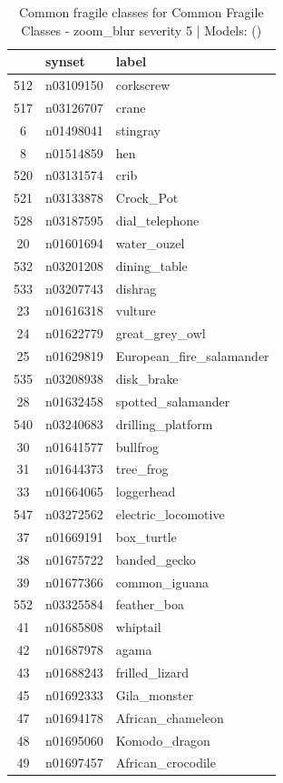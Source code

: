 \begin{table}
\caption{Common fragile classes for Common Fragile Classes - zoom_blur severity 5 | Models: ()}
\label{tab:Common Fragile Classes - zoom_blur severity 5_d41d8cd9}
\begin{tabular}{cll}
\toprule
 & synset & label \\
\midrule
512 & n03109150 & corkscrew \\
517 & n03126707 & crane \\
6 & n01498041 & stingray \\
8 & n01514859 & hen \\
520 & n03131574 & crib \\
521 & n03133878 & Crock_Pot \\
528 & n03187595 & dial_telephone \\
20 & n01601694 & water_ouzel \\
532 & n03201208 & dining_table \\
533 & n03207743 & dishrag \\
23 & n01616318 & vulture \\
24 & n01622779 & great_grey_owl \\
25 & n01629819 & European_fire_salamander \\
535 & n03208938 & disk_brake \\
28 & n01632458 & spotted_salamander \\
540 & n03240683 & drilling_platform \\
30 & n01641577 & bullfrog \\
31 & n01644373 & tree_frog \\
33 & n01664065 & loggerhead \\
547 & n03272562 & electric_locomotive \\
37 & n01669191 & box_turtle \\
38 & n01675722 & banded_gecko \\
39 & n01677366 & common_iguana \\
552 & n03325584 & feather_boa \\
41 & n01685808 & whiptail \\
42 & n01687978 & agama \\
43 & n01688243 & frilled_lizard \\
45 & n01692333 & Gila_monster \\
47 & n01694178 & African_chameleon \\
48 & n01695060 & Komodo_dragon \\
49 & n01697457 & African_crocodile \\

\end{tabular}
\end{table}
